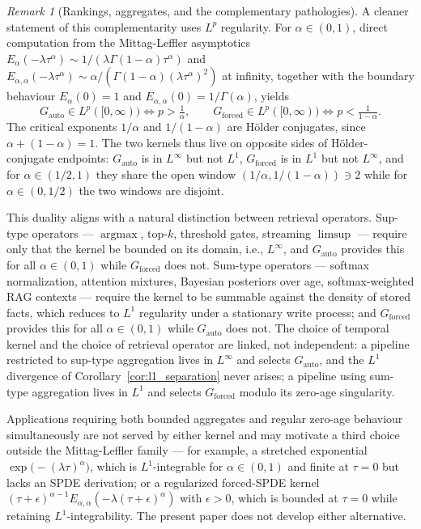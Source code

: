\documentclass[11pt]{article}
\theoremstyle{definition}
\theoremstyle{remark}
\newtheorem{remark}[theorem]{Remark}
\begin{document}
\begin{remark}[Rankings, aggregates, and the
complementary pathologies]
A cleaner statement of this complementarity uses
$L^p$ regularity.  For $\alpha \in (0, 1)$, direct
computation from the Mittag-Leffler asymptotics
$E_\alpha(-\lambda\tau^\alpha) \sim
1/(\lambda\Gamma(1-\alpha)\tau^\alpha)$ and
$E_{\alpha,\alpha}(-\lambda\tau^\alpha) \sim
\alpha/(\Gamma(1-\alpha)(\lambda\tau^\alpha)^2)$
at infinity, together with the boundary behaviour
$E_\alpha(0) = 1$ and
$E_{\alpha,\alpha}(0) = 1/\Gamma(\alpha)$, yields
\begin{equation}
G_{\mathrm{auto}} \in L^p([0,\infty))
\iff p > \tfrac{1}{\alpha},
\qquad
G_{\mathrm{forced}} \in L^p([0,\infty))
\iff p < \tfrac{1}{1-\alpha}.
\end{equation}
The critical exponents $1/\alpha$ and $1/(1-\alpha)$
are H\"older conjugates, since $\alpha + (1-\alpha) =
1$.  The two kernels thus live on opposite sides
of H\"older-conjugate endpoints: $G_{\mathrm{auto}}$
is in $L^\infty$ but not $L^1$,
$G_{\mathrm{forced}}$ is in $L^1$ but not $L^\infty$,
and for $\alpha \in (1/2, 1)$ they share the
open window $(1/\alpha, 1/(1-\alpha)) \ni 2$ while
for $\alpha \in (0, 1/2)$ the two windows are
disjoint.

This duality aligns with a natural distinction
between retrieval operators.  Sup-type operators
--- $\operatorname{argmax}$, top-$k$, threshold
gates, streaming $\limsup$ --- require only that
the kernel be bounded on its domain, i.e., $L^\infty$,
and $G_{\mathrm{auto}}$ provides this for all
$\alpha \in (0, 1)$ while $G_{\mathrm{forced}}$
does not.  Sum-type operators --- softmax
normalization, attention mixtures, Bayesian
posteriors over age, softmax-weighted RAG contexts
--- require the kernel to be summable against the
density of stored facts, which reduces to $L^1$
regularity under a stationary write process; and
$G_{\mathrm{forced}}$ provides this for all
$\alpha \in (0, 1)$ while $G_{\mathrm{auto}}$
does not.  The choice of temporal kernel and the
choice of retrieval operator are linked, not
independent: a pipeline restricted to sup-type
aggregation lives in $L^\infty$ and selects
$G_{\mathrm{auto}}$, and the $L^1$ divergence of
Corollary~\ref{cor:l1_separation} never arises;
a pipeline using sum-type aggregation lives in
$L^1$ and selects $G_{\mathrm{forced}}$ modulo its
zero-age singularity.

Applications requiring both bounded aggregates and
regular zero-age behaviour simultaneously are not
served by either kernel and may motivate a third
choice outside the Mittag-Leffler family --- for
example, a stretched exponential
$\exp\bigl(-(\lambda\tau)^\alpha\bigr)$, which is
$L^1$-integrable for $\alpha \in (0, 1)$ and finite
at $\tau = 0$ but lacks an SPDE derivation; or a
regularized forced-SPDE kernel
$(\tau + \epsilon)^{\alpha-1}
 E_{\alpha,\alpha}(-\lambda(\tau + \epsilon)^\alpha)$
with $\epsilon > 0$, which is bounded at $\tau = 0$
while retaining $L^1$-integrability.  The present
paper does not develop either alternative.
\end{remark}
\end{document}
